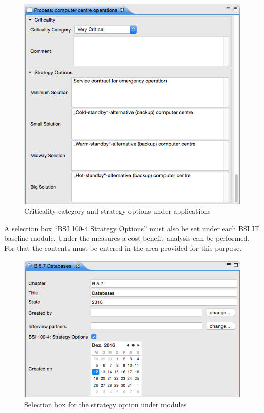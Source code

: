 \documentclass[a4paper,10pt]{book}
\begin{document}
\begin{figure}[!htb]
  \centering
  \includegraphics[width=\linewidth]{Screenshot/criticality-category-and-strategy-options-under-applications.png}
  \caption{Criticality category and strategy options under applications}
  \label{fig:criticality-category-and-strategy-options-under-applications}
\end{figure}

A selection box ``BSI 100-4 Strategy Options'' must also be set under each BSI
IT baseline module. Under the measures a cost-benefit analysis can be performed.
For that the contents must be entered in the area provided for this purpose.

\begin{figure}[!htb]
  \centering
  \includegraphics[width=\linewidth]{Screenshot/selection-box-for-the-strategy-option-under-modules.png}
  \caption{Selection box for the strategy option under modules}
  \label{fig:selection-box-for-the-strategy-option-under-modules}
\end{figure}
\end{document}
